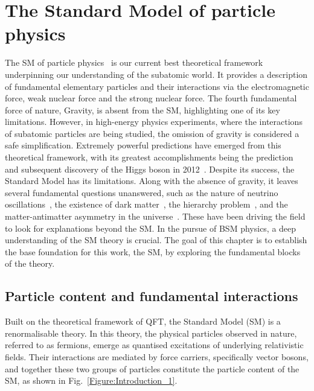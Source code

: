 \chapter{The Standard Model of particle physics}
\thispagestyle{plain}  %
\pagestyle{chapterpages}
\label{Section:Chapter1}
The \ac{SM} of particle physics~\cite{Glashow_1, Weinberg_1, Salam_1} is our current best theoretical framework underpinning our understanding of the subatomic world. It provides a description of fundamental elementary particles and their interactions via the electromagnetic force, weak nuclear force and the strong nuclear force. The fourth fundamental force of nature, Gravity, is absent from the SM, highlighting one of its key limitations. However, in high-energy physics experiments, where the interactions of subatomic particles are being studied, the omission of gravity is considered a safe simplification. Extremely powerful predictions have emerged from this theoretical framework, with its greatest accomplishments being the prediction~\cite{Englert_Brout,PeterHiggs_1,PeterHiggs_2, PeterHiggs_3, Guralnik_Hagen_Kibble, Kibble} and subsequent discovery of the Higgs boson in 2012~\cite{Higgs_ATLAS,Higgs_CMS}. Despite its success, the Standard Model has its limitations. Along with the absence of gravity, it leaves several fundamental questions unanswered, such as the nature of neutrino oscillations~\cite{Neutrino_Oscillations}, the existence of dark matter~\cite{DarkMatter}, the hierarchy problem~\cite{HierarchyProblem}, and the matter-antimatter asymmetry in the universe~\cite{MatterAntimatter}. These have been driving the field to look for explanations beyond the SM. In the pursue of \ac{BSM} physics, a deep understanding of the SM theory is crucial. The goal of this chapter is to establish the base foundation for this work, the SM, by exploring the fundamental blocks of the theory.

\section{Particle content and fundamental interactions}
\label{Section:Particle content and fundamental interactions}
Built on the theoretical framework of QFT, the Standard Model (SM) is a renormalisable theory. In this theory, the physical particles observed in nature, referred to as fermions, emerge as quantised excitations of underlying relativistic fields. Their interactions are mediated by force carriers, specifically vector bosons, and together these two groups of particles constitute the particle content of the SM, as shown in Fig.~\ref{Figure:Introduction_1}.


